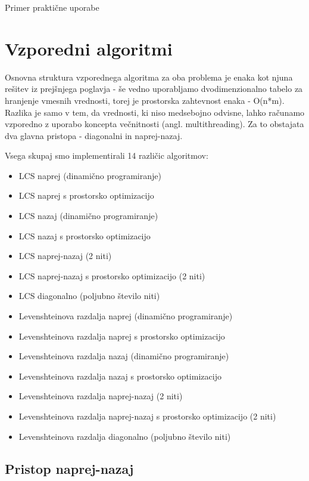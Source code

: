 \documentclass[a4paper,12pt,openright]{book}
\begin{document}
Primer praktične uporabe \cite{documentsimilarity}


\chapter{Vzporedni algoritmi}

Osnovna struktura vzporednega algoritma za oba problema je enaka kot njuna rešitev iz prejšnjega poglavja - še vedno uporabljamo dvodimenzionalno tabelo za hranjenje vmesnih vrednosti, torej je prostorska zahtevnost enaka - O(n*m). Razlika je samo v tem, da vrednosti, ki niso medsebojno odvisne, lahko računamo vzporedno z uporabo koncepta večnitnosti (angl. multithreading). Za to obstajata dva glavna pristopa - diagonalni in naprej-nazaj. 

Vsega skupaj smo implementirali 14 različic algoritmov:
\begin{itemize}
  \item LCS naprej (dinamično programiranje)
  \item LCS naprej s prostorsko optimizacijo
  \item LCS nazaj (dinamično programiranje)
  \item LCS nazaj s prostorsko optimizacijo
  \item LCS naprej-nazaj (2 niti)
  \item LCS naprej-nazaj s prostorsko optimizacijo (2 niti)
  \item LCS diagonalno (poljubno število niti)
  \item Levenshteinova razdalja naprej (dinamično programiranje)
  \item Levenshteinova razdalja naprej s prostorsko optimizacijo
  \item Levenshteinova razdalja nazaj (dinamično programiranje)
  \item Levenshteinova razdalja nazaj s prostorsko optimizacijo
  \item Levenshteinova razdalja naprej-nazaj (2 niti)
  \item Levenshteinova razdalja naprej-nazaj s prostorsko optimizacijo (2 niti)
  \item Levenshteinova razdalja diagonalno (poljubno število niti)
\end{itemize}

\section{Pristop naprej-nazaj}
\end{document}
